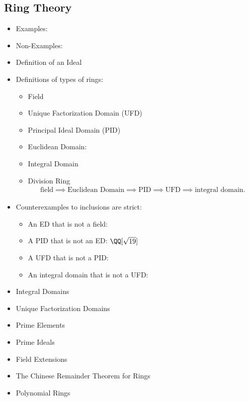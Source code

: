 \hypertarget{ring-theory}{%
\subsection{Ring Theory}\label{ring-theory}}


\begin{itemize}
\tightlist
\item
  Examples:
\item
  Non-Examples:
\item
  Definition of an Ideal
\item
  Definitions of types of rings:

  \begin{itemize}
  \tightlist
  \item
    Field
  \item
    Unique Factorization Domain (UFD)
  \item
    Principal Ideal Domain (PID)
  \item
    Euclidean Domain:
  \item
    Integral Domain
  \item
    Division Ring
    \begin{align*}  
    \text{field} \implies \text{Euclidean Domain} \implies \text{PID} \implies \text{UFD} \implies \text{integral domain}
    .\end{align*}
  \end{itemize}
\item
  Counterexamples to inclusions are strict:

  \begin{itemize}
  \tightlist
  \item
    An ED that is not a field:
  \item
    A PID that is not an ED: \(\QQ[\sqrt {19}]\)
  \item
    A UFD that is not a PID:
  \item
    An integral domain that is not a UFD:
  \end{itemize}
\item
  Integral Domains
\item
  Unique Factorization Domains
\item
  Prime Elements
\item
  Prime Ideals
\item
  Field Extensions
\item
  The Chinese Remainder Theorem for Rings
\item
  Polynomial Rings


\end{itemize}
